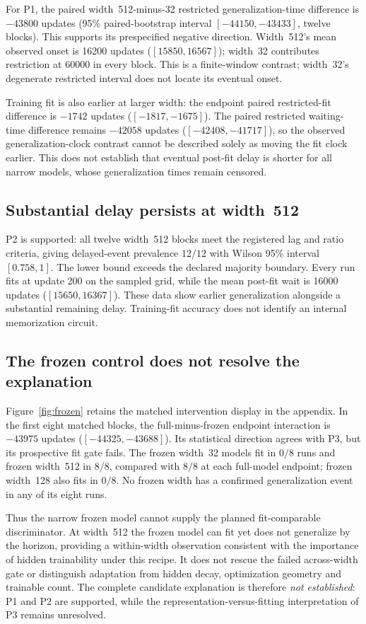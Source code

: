 For P1, the paired width~512-minus-32 restricted generalization-time difference is $-43800$ updates (95\% paired-bootstrap interval $[-44150,-43433]$, twelve blocks). This supports its prespecified negative direction. Width~512's mean observed onset is 16200 updates ($[15850,16567]$); width~32 contributes restriction at 60000 in every block. This is a finite-window contrast; width~32's degenerate restricted interval does not locate its eventual onset.

Training fit is also earlier at larger width: the endpoint paired restricted-fit difference is $-1742$ updates ($[-1817,-1675]$). The paired restricted waiting-time difference remains $-42058$ updates ($[-42408,-41717]$), so the observed generalization-clock contrast cannot be described solely as moving the fit clock earlier. This does not establish that eventual post-fit delay is shorter for all narrow models, whose generalization times remain censored.

\subsection{Substantial delay persists at width~512}
P2 is supported: all twelve width~512 blocks meet the registered lag and ratio criteria, giving delayed-event prevalence $12/12$ with Wilson 95\% interval $[0.758,1]$. The lower bound exceeds the declared majority boundary. Every run fits at update 200 on the sampled grid, while the mean post-fit wait is 16000 updates ($[15650,16367]$). These data show earlier generalization alongside a substantial remaining delay. Training-fit accuracy does not identify an internal memorization circuit.

\subsection{The frozen control does not resolve the explanation}
Figure~\ref{fig:frozen} retains the matched intervention display in the appendix. In the first eight matched blocks, the full-minus-frozen endpoint interaction is $-43975$ updates ($[-44325,-43688]$). Its statistical direction agrees with P3, but its prospective fit gate fails. The frozen width~32 models fit in $0/8$ runs and frozen width~512 in $8/8$, compared with $8/8$ at each full-model endpoint; frozen width~128 also fits in $0/8$. No frozen width has a confirmed generalization event in any of its eight runs.

Thus the narrow frozen model cannot supply the planned fit-comparable discriminator. At width~512 the frozen model can fit yet does not generalize by the horizon, providing a within-width observation consistent with the importance of hidden trainability under this recipe. It does not rescue the failed across-width gate or distinguish adaptation from hidden decay, optimization geometry and trainable count. The complete candidate explanation is therefore \emph{not established}: P1 and P2 are supported, while the representation-versus-fitting interpretation of P3 remains unresolved.


